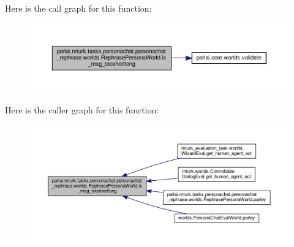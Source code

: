 Here is the call graph for this function\+:
\nopagebreak
\begin{figure}[H]
\begin{center}
\leavevmode
\includegraphics[width=350pt]{classparlai_1_1mturk_1_1tasks_1_1personachat_1_1personachat__rephrase_1_1worlds_1_1RephrasePersonaWorld_a0f7d1da525b71529c408a4f944fa036a_cgraph}
\end{center}
\end{figure}
Here is the caller graph for this function\+:
\nopagebreak
\begin{figure}[H]
\begin{center}
\leavevmode
\includegraphics[width=350pt]{classparlai_1_1mturk_1_1tasks_1_1personachat_1_1personachat__rephrase_1_1worlds_1_1RephrasePersonaWorld_a0f7d1da525b71529c408a4f944fa036a_icgraph}
\end{center}
\end{figure}
\mbox{\label{classparlai_1_1mturk_1_1tasks_1_1personachat_1_1personachat__rephrase_1_1worlds_1_1RephrasePersonaWorld_a534d1775b3a45b3765ea0ee65c5cc201}} 
